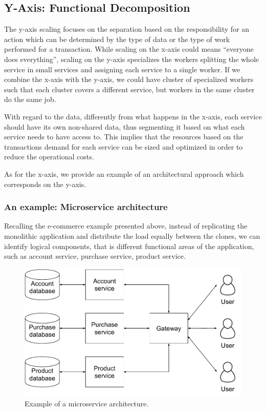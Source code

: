 \subsection{Y-Axis: Functional Decomposition}
\label{sec:y-axis}
The y-axis scaling focuses on the separation based on the responsibility for an
action which can be determined by the type of data or the type of work performed
for a transaction. While scaling on the x-axis could means ``everyone does
everything'', scaling on the y-axis specializes the workers splitting the whole
service in small services and assigning each service to a single worker. If we
combine the x-axis with the y-axis, we could have cluster of specialized workers
such that each cluster covers a different service, but workers in the same
cluster do the same job.

With regard to the data, differently from what happens in the x-axis, each
service should have its own non-shared data, thus segmenting it based on what
each service needs to have access to. This implies that the resources based on
the transactions demand for each service can be sized and optimized in order to
reduce the operational costs.

As for the x-axis, we provide an example of an architectural
approach which corresponds on the y-axis.

\subsubsection{An example: Microservice architecture}
Recalling the e-commerce example presented above, instead of replicating the
monolithic application and distribute the load equally between the clones, we
can identify logical components, that is different functional areas of the
application, such as account service, purchase service, product service.

\begin{figure}
	\begin{center}
		\includegraphics[width=.7\textwidth]{./res/img/microservice-architecture.pdf}
	\end{center}
	\caption{Example of a microservice architecture.}
	\label{fig:microservice-architecture}
\end{figure}

